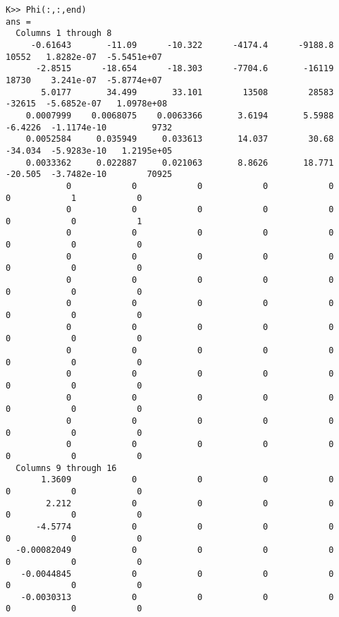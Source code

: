 \documentclass[]{article}
\begin{document}
\begin{lstlisting}
K>> Phi(:,:,end)
ans =
  Columns 1 through 8
     -0.61643       -11.09      -10.322      -4174.4      -9188.8        10552   1.8282e-07  -5.5451e+07
      -2.8515      -18.654      -18.303      -7704.6       -16119        18730    3.241e-07  -5.8774e+07
       5.0177       34.499       33.101        13508        28583       -32615  -5.6852e-07   1.0978e+08
    0.0007999    0.0068075    0.0063366       3.6194       5.5988      -6.4226  -1.1174e-10         9732
    0.0052584     0.035949     0.033613       14.037        30.68      -34.034  -5.9283e-10   1.2195e+05
    0.0033362     0.022887     0.021063       8.8626       18.771      -20.505  -3.7482e-10        70925
            0            0            0            0            0            0            1            0
            0            0            0            0            0            0            0            1
            0            0            0            0            0            0            0            0
            0            0            0            0            0            0            0            0
            0            0            0            0            0            0            0            0
            0            0            0            0            0            0            0            0
            0            0            0            0            0            0            0            0
            0            0            0            0            0            0            0            0
            0            0            0            0            0            0            0            0
            0            0            0            0            0            0            0            0
            0            0            0            0            0            0            0            0
            0            0            0            0            0            0            0            0
  Columns 9 through 16
       1.3609            0            0            0            0            0            0            0
        2.212            0            0            0            0            0            0            0
      -4.5774            0            0            0            0            0            0            0
  -0.00082049            0            0            0            0            0            0            0
   -0.0044845            0            0            0            0            0            0            0
   -0.0030313            0            0            0            0            0            0            0

\end{lstlisting}
\end{document}
